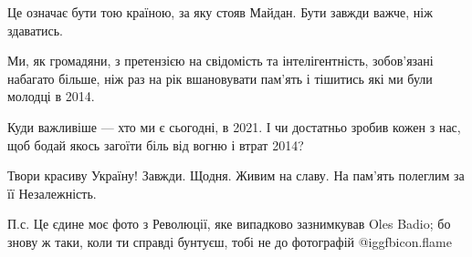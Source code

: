 Це означає бути тою країною, за яку стояв Майдан. Бути завжди важче, ніж
здаватись. 

Ми, як громадяни, з претензією на свідомість та інтелігентність, зобов’язані
набагато більше, ніж раз на рік вшановувати пам’ять і тішитись які ми були
молодці в 2014. 

Куди важливіше — хто ми є сьогодні, в 2021. І чи достатньо зробив кожен з нас,
щоб бодай якось загоїти біль від вогню і  втрат 2014?

Твори красиву Україну! Завжди. Щодня. Живим на славу. На пам’ять полеглим за її
Незалежність. 

П.с. Це єдине моє фото з Революції, яке  випадково зазнимкував Oles Badio; бо
знову ж таки, коли ти справді бунтуєш, тобі не до фотографій  @igg{fbicon.flame} 

